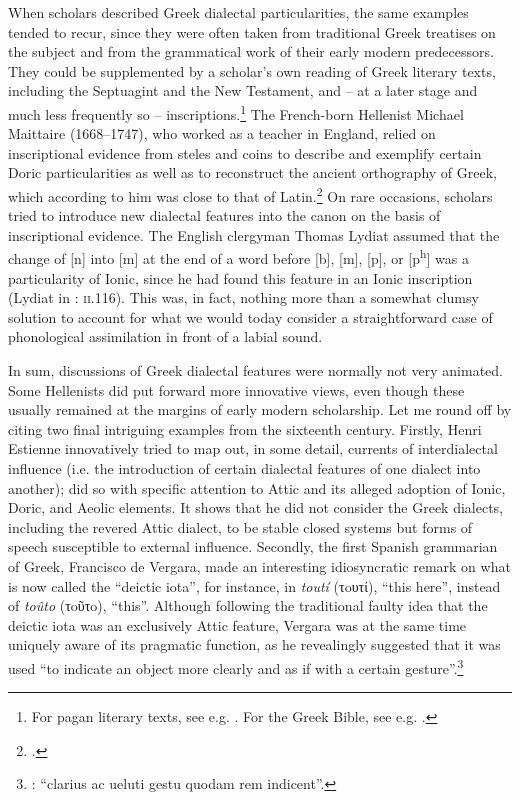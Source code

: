 When scholars described Greek dialectal particularities, the same examples tended to recur, since they were often taken from traditional Greek treatises on the subject and from the grammatical work of their early modern predecessors. They could be supplemented by a scholar’s own reading of Greek literary texts, including the Septuagint and the New Testament, and – at a later stage and much less frequently so – inscriptions.\footnote{For pagan literary texts, see e.g. \citet[]{Amerot1520, Amerot1530}. For the Greek Bible, see e.g. \citet{Pasor1632}.} The French-born Hellenist Michael Maittaire (1668–1747), who worked as a teacher in England, relied on inscriptional evidence from steles and coins to describe and exemplify certain Doric particularities as well as to reconstruct the ancient orthography of Greek, which according to him was close to that of Latin.\footnote{\citet[e.g. 161–167, 170, 184, 205–206, 211–212, 221, 240, 243]{Maittaire1706}.} On rare occasions, scholars tried to introduce new dialectal features into the canon on the basis of inscriptional evidence. The English clergyman Thomas Lydiat assumed that the change of [n] into [m] at the end of a word before [b], [m], [p], or [p\textsuperscript{h}] was a particularity of Ionic, since he had found this feature in an Ionic inscription (Lydiat in \citealt{Prideaux1676}: \textsc{ii}.116). This was, in fact, nothing more than a somewhat clumsy solution to account for what we would today consider a straightforward case of phonological assimilation in front of a labial sound.

In sum, discussions of Greek dialectal features were normally not very animated. Some Hellenists did put forward more innovative views, even though these usually remained at the margins of early modern scholarship. Let me round off by citing two final intriguing examples from the sixteenth century. Firstly, Henri Estienne innovatively tried to map out, in some detail, currents of interdialectal influence (i.e. the introduction of certain dialectal features of one dialect into another); \citet[22-28]{Estienne1581} did so with specific attention to Attic and its alleged adoption of Ionic, Doric, and Aeolic elements. It shows that he did not consider the Greek dialects, including the revered Attic dialect, to be stable closed systems but forms of speech susceptible to external influence. Secondly, the first Spanish grammarian of Greek, Francisco de Vergara, made an interesting idiosyncratic remark on what is now called the “deictic iota”, for instance, in \textit{toutí} (τoυτί), “this here”, instead of \textit{toûto} (τoῦτo), “this”. Although following the traditional faulty idea that the deictic iota was an exclusively Attic feature, Vergara was at the same time uniquely aware of its pragmatic function, as he revealingly suggested that it was used “to indicate an object more clearly and as if with a certain gesture”.\footnote{\citet[218]{Vergara1537}: “clarius ac ueluti gestu quodam rem indicent”.}

